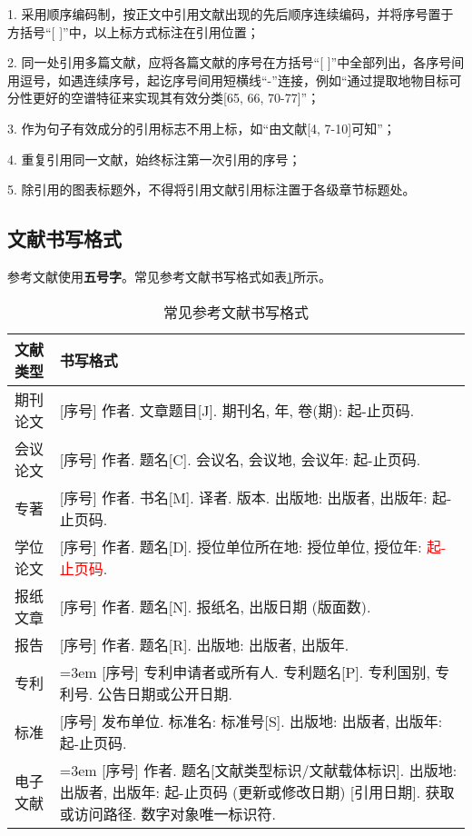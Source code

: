 1. 采用顺序编码制，按正文中引用文献出现的先后顺序连续编码，并将序号置于方括号“[ ]”中，以上标方式标注在引用位置；

2. 同一处引用多篇文献，应将各篇文献的序号在方括号“[ ]”中全部列出，各序号间用逗号，如遇连续序号，起讫序号间用短横线“-”连接，例如“通过提取地物目标可分性更好的空谱特征来实现其有效分类[65, 66, 70-77]”；

3. 作为句子有效成分的引用标志不用上标，如“由文献[4, 7-10]可知”；

4. 重复引用同一文献，始终标注第一次引用的序号；

5. 除引用的图表标题外，不得将引用文献引用标注置于各级章节标题处。

\subsection{文献书写格式}

参考文献使用\textbf{五号字}。常见参考文献书写格式如表\ref{tab2-3}所示。


\begin{table}[!ht]
\centering
\caption{常见参考文献书写格式}
\label{tab2-3}
\begin{tabular}{m{4em}<{\centering}m{}<{\raggedright}}
\toprule
文献类型 & 书写格式 \\
\midrule
期刊论文 & [序号] 作者. 文章题目[J]. 期刊名, 年, 卷(期): 起-止页码. \\
会议论文 & [序号] 作者. 题名[C]. 会议名, 会议地, 会议年: 起-止页码. \\
专著 & [序号] 作者. 书名[M]. 译者. 版本. 出版地: 出版者, 出版年: 起-止页码. \\
学位论文 & [序号] 作者. 题名[D]. 授位单位所在地: 授位单位, 授位年: \textcolor{red}{起-止页码}. \\
报纸文章 & [序号] 作者. 题名[N]. 报纸名, 出版日期 (版面数). \\
报告 & [序号] 作者. 题名[R]. 出版地: 出版者, 出版年.\\
专利 & \hangindent=3em [序号] 专利申请者或所有人. 专利题名[P]. 专利国别, 专利号. 公告日期或公开日期. \\
标准 & [序号] 发布单位. 标准名: 标准号[S]. 出版地: 出版者, 出版年: 起-止页码. \\
电子文献 & \hangindent=3em [序号] 作者. 题名[文献类型标识/文献载体标识]. 出版地: 出版者, 出版年: 起-止页码 (更新或修改日期) [引用日期]. 获取或访问路径. 数字对象唯一标识符.\\
\bottomrule
\end{tabular}
\end{table}

